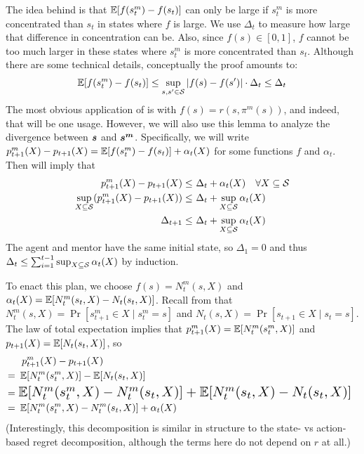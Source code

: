 The idea behind  is that $\operatorname*{\mathbb{E}}[f(s_t^m) - f(s_t)]$ can only be large if $s_t^m$ is more concentrated than $s_t$ in states where $f$ is large. We use $\Delta_t$ to measure how large that difference in concentration can be. Also, since $f(s) \in [0,1]$, $f$ cannot be too much larger in these states where $s_t^m$ is more concentrated than $s_t$. Although there are some technical details, conceptually the proof amounts to:
\begin{align*}
\operatorname*{\mathbb{E}}[f(s_t^m) - f(s_t)] \le \sup_{s,s' \in \mathcal{S}} |f(s) - f(s')|\cdot  \Delta_t
\le  \Delta_t
\end{align*}
The most obvious application of  is with $f(s) = r(s, \pi^m(s))$, and indeed, that will be one usage. However, we will also use this lemma to analyze the divergence between $\boldsymbol{s}$ and $\boldsymbol{s^m}$. Specifically, we will write $p_{t+1}^m(X) - p_{t+1}(X) = \operatorname*{\mathbb{E}}[f(s_t^m) - f(s_t)] + \alpha_t(X)$ for some functions $f$ and $\alpha_t$. Then  will imply that
\begin{align*}
p_{t+1}^m(X) - p_{t+1}(X) \le&\ \Delta_t + \alpha_t(X) \quad \text{$\forall X \subseteq \mathcal{S}$}\\
\sup_{X\subseteq \mathcal{S}} (p_{t+1}^m(X) - p_{t+1}(X)) \le&\ \Delta_t + \sup_{X\subseteq \mathcal{S}} \alpha_t(X)\\
\Delta_{t+1} \le&\ \Delta_t + \sup_{X\subseteq \mathcal{S}} \alpha_t(X)
\end{align*}
The agent and mentor have the same initial state, so $\Delta_1 = 0$ and thus $\Delta_t \le \sum_{i=1}^{t-1} \sup_{X\subseteq \mathcal{S}} \alpha_t(X)$ by induction.

To enact this plan, we choose $f(s) = N_t^m(s,X)$ and $\alpha_t(X) = \operatorname*{\mathbb{E}}[N_t^m(s_t, X) - N_t(s_t, X)]$. Recall from  that $N_t^m(s, X) = \Pr[s_{t+1}^m \in X \mid s_t^m = s]$ and $N_t(s,X) = \Pr[s_{t+1} \in X \mid s_t = s]$. The law of total expectation implies that $p_{t+1}^m(X) = \operatorname*{\mathbb{E}}[N_t^m(s_t^m, X)]$ and $p_{t+1}(X) = \operatorname*{\mathbb{E}}[N_t(s_t, X)]$, so
\begin{align*}
& \ \ p_{t+1}^m(X) - p_{t+1}(X)\\
=&\ \E[N_t^m(s_t^m, X)] - \E[N_t(s_t, X)]\\
=&\ \resizebox{\linewidth}{!}{%
\(\E[N_t^m(s_t^m, X) - N_t^m(s_t, X)] + \E[N_t^m(s_t, X) - N_t(s_t, X)]\)
}
\\
=&\ \E[N_t^m(s_t^m, X) - N_t^m(s_t, X)] + \alpha_t(X)
\end{align*}
(Interestingly, this decomposition is similar in structure to the state- vs action-based regret decomposition, although the terms here do not depend on $r$ at all.) 

